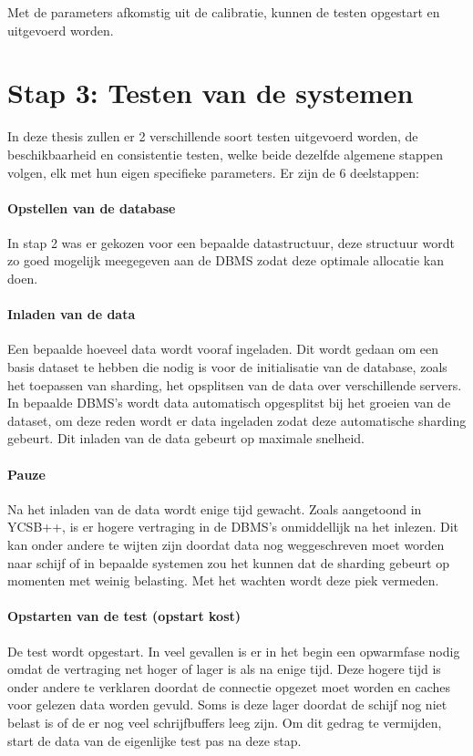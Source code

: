 Met de parameters afkomstig uit de calibratie, kunnen de testen opgestart en uitgevoerd worden. 

\section{Stap 3: Testen van de systemen}
In deze thesis zullen er 2 verschillende soort testen uitgevoerd worden, de beschikbaarheid en consistentie testen, welke beide dezelfde algemene stappen volgen, elk met hun eigen specifieke parameters. Er zijn de 6 deelstappen: 

\paragraph{Opstellen van de database} In stap 2 was er gekozen voor een bepaalde datastructuur, deze structuur wordt zo goed mogelijk meegegeven aan de DBMS zodat deze optimale allocatie kan doen.

\paragraph{Inladen van de data} Een bepaalde hoeveel data wordt vooraf ingeladen. Dit wordt gedaan om een basis dataset te hebben die nodig is voor de initialisatie van de database, zoals het toepassen van sharding, het opsplitsen van de data over verschillende servers. In bepaalde DBMS's wordt data automatisch opgesplitst bij het groeien van de dataset, om deze reden wordt er data ingeladen zodat deze automatische sharding gebeurt. Dit inladen van de data gebeurt op maximale snelheid. 

\paragraph{Pauze} Na het inladen van de data wordt enige tijd gewacht. Zoals aangetoond in YCSB++\cite[Figuur 9]{patil2011ycsb++}, is er hogere vertraging in de DBMS's onmiddellijk na het inlezen. Dit kan onder andere te wijten zijn doordat data nog weggeschreven moet worden naar schijf of in bepaalde systemen zou het kunnen dat de sharding gebeurt op momenten met weinig belasting. Met het wachten wordt deze piek vermeden. 

\paragraph{Opstarten van de test (opstart kost)} De test wordt opgestart. In veel gevallen is er in het begin een opwarmfase nodig omdat de vertraging net hoger of lager is als na enige tijd. Deze hogere tijd is onder andere te verklaren doordat de connectie opgezet moet worden en caches voor gelezen data worden gevuld. Soms is deze lager doordat de schijf nog niet belast is of de er nog veel schrijfbuffers leeg zijn. Om dit gedrag te vermijden, start de data van de eigenlijke test pas na deze stap. 

